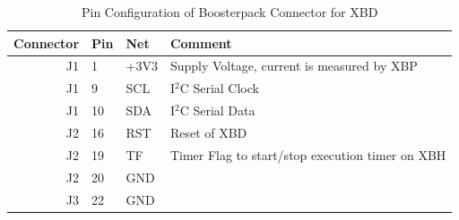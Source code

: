 \documentclass{article}
\begin{document}
\begin{table}[ht]
  \begin{center}
    \caption{Pin Configuration of Boosterpack Connector for XBD}
    \begin{tabular}{rlll}
      Connector & Pin  & Net         & Comment  \\ \hline
       J1 & 1  & +3V3      & Supply Voltage, current is measured by XBP \\
       J1 & 9  & SCL       & I$^2$C Serial Clock  \\
       J1 & 10 & SDA       & I$^2$C Serial Data \\
       J2 & 16 & RST       & Reset of XBD \\ 
       J2 & 19 & TF        & Timer Flag to start/stop execution timer on XBH \\
       J2 & 20 & GND       & \\
       J3 & 22 & GND       & \\ \hline
    \end{tabular}
  \end{center}
\end{table}
\end{document}
